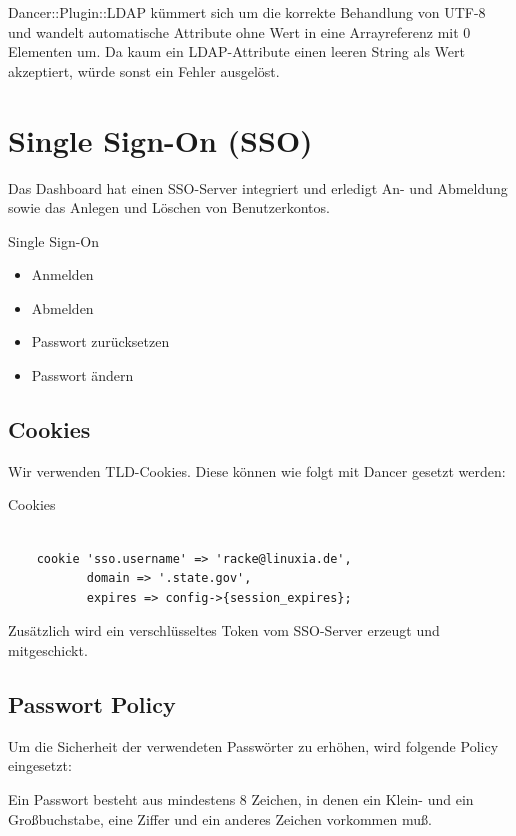 Dancer::Plugin::LDAP kümmert sich um die korrekte Behandlung
von UTF-8 und wandelt automatische Attribute ohne Wert in eine
Arrayreferenz mit 0 Elementen um. Da kaum ein LDAP-Attribute einen
leeren String als Wert akzeptiert, würde sonst ein Fehler
ausgelöst.

\section{Single Sign-On (SSO)}

Das Dashboard hat einen SSO-Server integriert und erledigt An- und
Abmeldung sowie das Anlegen und Löschen von Benutzerkontos.

\begin{frame}{Single Sign-On}
\begin{itemize}
\item Anmelden
\item Abmelden
\item Passwort zurücksetzen
\item Passwort ändern
\end{itemize}
\end{frame}

\subsection{Cookies}

Wir verwenden TLD-Cookies. Diese können wie folgt mit Dancer
gesetzt werden:

\begin{frame}[fragile]{Cookies}
\begin{lstlisting}

    cookie 'sso.username' => 'racke@linuxia.de',
           domain => '.state.gov',
           expires => config->{session_expires};

\end{lstlisting}
\end{frame}

Zusätzlich wird ein verschlüsseltes Token vom SSO-Server
erzeugt und mitgeschickt.                       
                       
\subsection{Passwort Policy}

Um die Sicherheit der verwendeten Passwörter zu erhöhen, wird
folgende Policy eingesetzt:

Ein Passwort besteht aus mindestens 8 Zeichen, in denen
ein Klein- und ein Großbuchstabe, eine Ziffer und ein
anderes Zeichen vorkommen muß.

